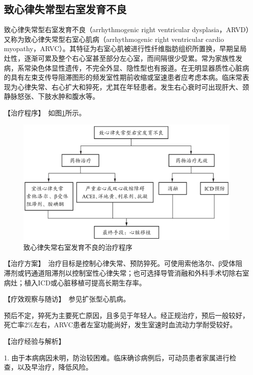 \subsection{致心律失常型右室发育不良}

致心律失常型右室发育不良（arrhythmogenic right ventricular
dysplasia，ARVD）又称为致心律失常型右室心肌病（arrhythmogenic right
ventricular cardio
myopathy，ARVC）。其特征为右室心肌被进行性纤维脂肪组织所置换，早期呈局灶性，逐渐可累及整个右心室甚至部分左心室，而间隔很少受累。常为家族性发病，系常染色体显性遗传，不完全外显、隐性型也有报道。在无明显器质性心脏病的具有左束支传导阻滞图形的频发室性期前收缩或室速患者应考虑本病。临床常表现为心律失常、右心扩大和猝死，尤其在年轻患者。发生右心衰时可出现肝大、颈静脉怒张、下肢水肿和腹水等。

【治疗程序】　如图\ref{fig2-13-2}所示。

\begin{figure}[!htbp]
 \centering
 \includegraphics{./images/Image00081.jpg}
 \captionsetup{justification=centering}
 \caption{致心律失常右室发育不良的治疗程序}
 \label{fig2-13-2}
  \end{figure} 

【治疗方案】　治疗目标是控制心律失常、预防猝死。可使用索他洛尔、β受体阻滞剂或钙通道阻滞剂以控制室性心律失常；也可选择导管消融和外科手术切除右室病灶；植入ICD或心脏移植可提高长期生存率。

【疗效观察与随访】　参见扩张型心肌病。

预后不定，猝死为主要死亡原因，且多见于年轻人。经正规治疗，预后一般较好，死亡率2\%左右，ARVC患者左室功能尚好，发生室速时血流动力学耐受较好。

【治疗经验与解析】

1.
由于本病病因未明，防治较困难。临床确诊病例后，可动员患者家属进行检查，以及早治疗，降低风险。

